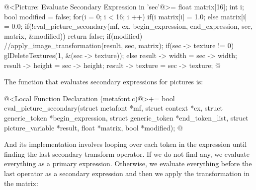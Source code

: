 \iniciocodigo
@<Picture: Evaluate Secondary Expression in 'sec'@>=
{
  float matrix[16];
  int i;
  bool modified = false;
  for(i = 0; i < 16; i ++)
    if(i %
      matrix[i] = 1.0;
    else
      matrix[i] = 0.0;
  if(!eval_picture_secondary(mf, cx, begin_expression, end_expression, sec,
                             matrix, &modified))
    return false;
  if(modified){
    //apply_image_transformation(result, sec, matrix);
    if(sec -> texture != 0)
      glDeleteTextures(1, &(sec -> texture));
  }
  else{
    result -> width = sec -> width;
    result -> height = sec -> height;
    result -> texture = sec -> texture;
  }
}
@
\fimcodigo

The function that evaluates secondary expressions for pictures is:

\iniciocodigo
@<Local Function Declaration (metafont.c)@>+=
bool eval_picture_secondary(struct metafont *mf, struct context *cx,
                            struct generic_token *begin_expression,
                            struct generic_token *end_token_list,
                            struct picture_variable *result,
                            float *matrix, bool *modified);
@
\fimcodigo

And its implementation involves looping over each token in the
expression until finding the last secondary transform operator. If we
do not find any, we evaluate everything as a primary
expression. Otherwise, we evaluate everything before the last operator
as a secondary expression and then we apply the transformation in the
matrix:

